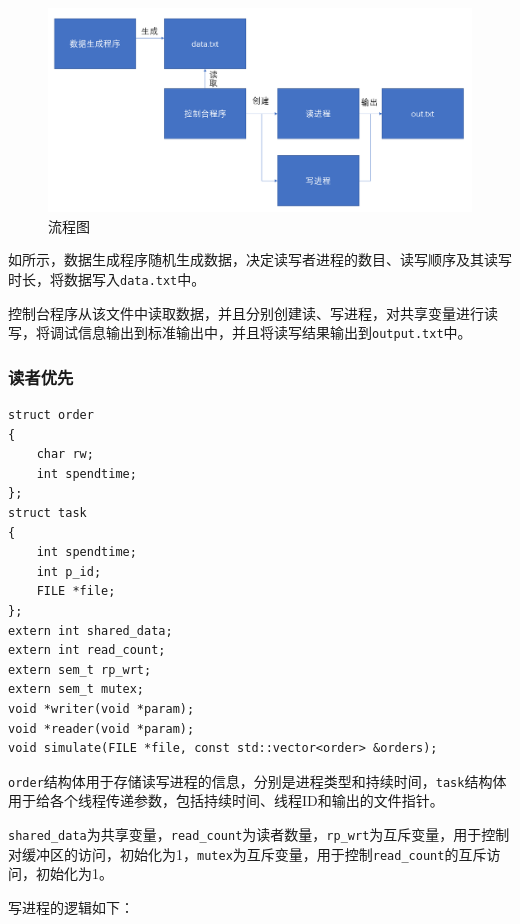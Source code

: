 \documentclass[lang=cn,11pt,a4paper,cite=authornum]{paper}
\begin{document}
\begin{figure}[htbp]

    \centering
    \includegraphics[width=0.8\linewidth]{./images/prog.png}
    \caption{流程图\label{fig:prog}}

\end{figure}

如所示，数据生成程序随机生成数据，决定读写者进程的数目、读写顺序及其读写时长，将数据写入\texttt{data.txt}中。

控制台程序从该文件中读取数据，并且分别创建读、写进程，对共享变量进行读写，将调试信息输出到标准输出中，并且将读写结果输出到\texttt{output.txt}中。

\subsubsection{读者优先}

\begin{code}
\begin{verbatim}
struct order
{
    char rw;
    int spendtime;
};
struct task
{
    int spendtime;
    int p_id;
    FILE *file;
};
extern int shared_data;
extern int read_count;
extern sem_t rp_wrt;
extern sem_t mutex;
void *writer(void *param);
void *reader(void *param);
void simulate(FILE *file, const std::vector<order> &orders);
\end{verbatim}
\end{code}

\texttt{order}结构体用于存储读写进程的信息，分别是进程类型和持续时间，\texttt{task}结构体用于给各个线程传递参数，包括持续时间、线程ID和输出的文件指针。

\texttt{shared_data}为共享变量，\texttt{read_count}为读者数量，\texttt{rp_wrt}为互斥变量，用于控制对缓冲区的访问，初始化为1，\texttt{mutex}为互斥变量，用于控制\texttt{read_count}的互斥访问，初始化为1。

写进程的逻辑如下：
\end{document}
